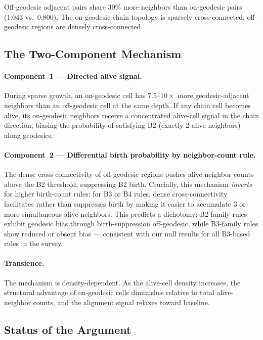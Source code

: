 \documentclass[12pt,a4paper]{article}
\begin{document}
Off-geodesic adjacent pairs share 30\% more neighbors than on-geodesic pairs (1.043 vs.\ 0.800). The on-geodesic chain topology is sparsely cross-connected; off-geodesic regions are densely cross-connected.

\subsection{The Two-Component Mechanism}

\paragraph{Component~1 --- Directed alive signal.}
During sparse growth, an on-geodesic cell has $7.5$--$10\times$ more geodesic-adjacent neighbors than an off-geodesic cell at the same depth. If any chain cell becomes alive, its on-geodesic neighbors receive a concentrated alive-cell signal in the chain direction, biasing the probability of satisfying B2 (exactly 2 alive neighbors) along geodesics.

\paragraph{Component~2 --- Differential birth probability by neighbor-count rule.}
The dense cross-connectivity of off-geodesic regions pushes alive-neighbor counts above the B2 threshold, suppressing B2 birth. Crucially, this mechanism \emph{inverts} for higher birth-count rules: for B3 or B4 rules, dense cross-connectivity facilitates rather than suppresses birth by making it easier to accumulate 3 or more simultaneous alive neighbors. This predicts a dichotomy: B2-family rules exhibit geodesic bias through birth-suppression off-geodesic, while B3-family rules show reduced or absent bias --- consistent with our null results for all B3-based rules in the survey.

\paragraph{Transience.}
The mechanism is density-dependent. As the alive-cell density increases, the structural advantage of on-geodesic cells diminishes relative to total alive-neighbor counts, and the alignment signal relaxes toward baseline.

\subsection{Status of the Argument}
\end{document}
